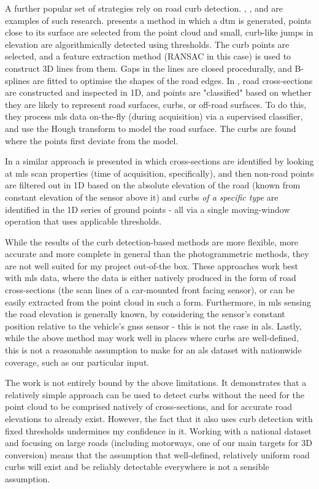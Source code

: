 A further popular set of strategies rely on road curb detection. \cite{vosselman_zhou_2009}, \cite{zhang_2010}, and \cite{yang_etal_2013} are examples of such research. \cite{vosselman_zhou_2009} presents a method in which a \ac{dtm} is generated, points close to its surface are selected from the point cloud and small, curb-like jumps in elevation are algorithmically detected using thresholds. The curb points are selected, and a feature extraction method (RANSAC in this case) is used to construct 3D lines from them. Gaps in the lines are closed procedurally, and B-splines are fitted to optimise the shapes of the road edges. In \cite{zhang_2010}, road cross-sections are constructed and inspected in 1D, and points are "classified" based on whether they are likely to represent road surfaces, curbs, or off-road surfaces. To do this, they process \ac{mls} data on-the-fly (during acquisition) via a supervised classifier, and use the Hough transform to model the road surface. The curbs are found where the points first deviate from the model.

In \cite{yang_etal_2013} a similar approach is presented in which cross-sections are identified by looking at \ac{mls} scan properties (time of acquisition, specifically), and then non-road points are filtered out in 1D based on the absolute elevation of the road (known from constant elevation of the sensor above it) and curbs \textit{of a specific type} are identified in the 1D series of ground points - all via a single moving-window operation that uses applicable thresholds.

While the results of the curb detection-based methods are more flexible, more accurate and more complete in general than the photogrammetric methods, they are not well suited for my project out-of-the box. These approaches work best with \ac{mls} data, where the data is either natively produced in the form of road cross-sections (the scan lines of a car-mounted front facing sensor), or can be easily extracted from the point cloud in such a form. Furthermore, in \ac{mls} sensing the road elevation is generally known, by considering the sensor's constant position relative to the vehicle's \ac{gnss} sensor - this is not the case in \ac{als}. Lastly, while the above method may work well in places where curbs are well-defined, this is not a reasonable assumption to make for an \ac{als} dataset with nationwide coverage, such as our particular input.

The work \cite{vosselman_zhou_2009} is not entirely bound by the above limitations. It demonstrates that a relatively simple approach can be used to detect curbs without the need for the point cloud to be comprised natively of cross-sections, and for accurate road elevations to already exist. However, the fact that it also uses curb detection with fixed thresholds undermines my confidence in it. Working with a national dataset and focusing on large roads (including motorways, one of our main targets for 3D conversion) means that the assumption that well-defined, relatively uniform road curbs will exist and be reliably detectable everywhere is not a sensible assumption.

